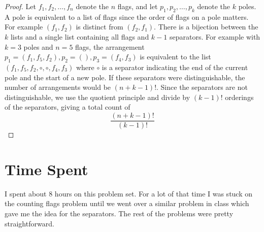 \documentclass[12pt]{article}
\begin{document}
\begin{proof}
Let $f_1, f_2, \ldots, f_n$ denote the $n$ flags, and let $p_1, p_2, \ldots, p_k$ denote the $k$ poles. A pole is equivalent to a list of flags since the order of flags on a pole matters. For example $(f_1, f_2)$ is distinct from $(f_2, f_1)$. There is a bijection between the $k$ lists and a single list containing all flags and $k-1$ separators. For example with $k=3$ poles and $n=5$ flags, the arrangement $p_1 = (f_1, f_5, f_2), p_2 = (), p_3 = (f_4, f_3)$ is equivalent to the list $(f_1, f_5, f_2, \circ, \circ, f_4, f_3)$ where $\circ$ is a separator indicating the end of the current pole and the start of a new pole. If these separators were distinguishable, the number of arrangements would be $(n+k-1)!$. Since the separators are not distinguishable, we use the quotient principle and divide by $(k-1)!$ orderings of the separators, giving a total count of 
\[
\frac{(n+k-1)!}{(k-1)!}
\]

\end{proof}

\section {Time Spent}

I spent about 8 hours on this problem set. For a lot of that time I was stuck on the counting flags problem until we went over a similar problem in class which gave me the idea for the separators. The rest of the problems were pretty straightforward.
\end{document}
